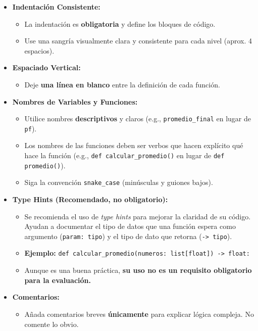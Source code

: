 \documentclass[11pt,a4paper]{article}
\begin{document}
\begin{itemize}[leftmargin=*]
    \item \textbf{Indentación Consistente:}
    \begin{itemize}
        \item La indentación es \textbf{obligatoria} y define los bloques de código.
        \item Use una sangría visualmente clara y consistente para cada nivel (aprox. 4 espacios).
    \end{itemize}
    
    \item \textbf{Espaciado Vertical:}
    \begin{itemize}
        \item Deje \textbf{una línea en blanco} entre la definición de cada función.
    \end{itemize}
    
    \item \textbf{Nombres de Variables y Funciones:}
    \begin{itemize}
        \item Utilice nombres \textbf{descriptivos} y claros (e.g., \texttt{promedio\_final} en lugar de \texttt{pf}).
        \item Los nombres de las funciones deben ser verbos que hacen explícito qué hace la función (e.g., \texttt{def calcular\_promedio()} en lugar de \texttt{def promedio()}).
        \item Siga la convención \texttt{snake\_case} (minúsculas y guiones bajos).
    \end{itemize}
    
    \item \textbf{Type Hints (Recomendado, no obligatorio):}
    \begin{itemize}
        \item Se recomienda el uso de \textit{type hints} para mejorar la claridad de su código. Ayudan a documentar el tipo de datos que una función espera como argumento (\texttt{param: tipo}) y el tipo de dato que retorna (\texttt{-> tipo}).
        \item \textbf{Ejemplo:} \texttt{def calcular\_promedio(numeros: list[float]) -> float:}
        \item Aunque es una buena práctica, \textbf{su uso no es un requisito obligatorio para la evaluación.}
    \end{itemize}
    
    \item \textbf{Comentarios:}
    \begin{itemize}
        \item Añada comentarios breves \textbf{únicamente} para explicar lógica compleja. No comente lo obvio.
    \end{itemize}
    

\end{itemize}
\end{document}
